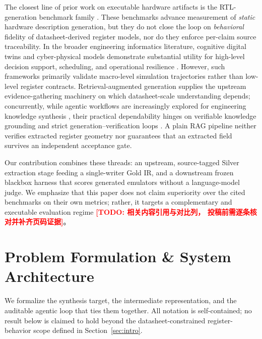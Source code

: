 \documentclass[preprint,review]{elsarticle}
\theoremstyle{definition}
\newcommand{\todo}[1]{\textcolor{red}{\textbf{[TODO: #1]}}}
\begin{document}
The closest line of prior work on executable hardware artifacts is the RTL-generation
benchmark family \cite{thakur2023verilogeval,lu2024rtllm,liu2023chipnemo}. These benchmarks
advance measurement of {\em static} hardware description generation, but they do not close
the loop on {\em behavioral} fidelity of datasheet-derived register models, nor do they
enforce per-claim source traceability. In the broader engineering informatics literature,
cognitive digital twins and cyber-physical models demonstrate substantial utility for
high-level decision support, scheduling, and operational resilience \cite{gao2024digital,lim2024graph,lim2024incorporating}.
However, such frameworks primarily validate macro-level simulation trajectories rather than
low-level register contracts. Retrieval-augmented generation \cite{lewis2020retrieval}
supplies the upstream evidence-gathering machinery on which datasheet-scale understanding
depends; concurrently, while agentic workflows are increasingly explored for engineering
knowledge synthesis \cite{zhou2025examining,trappey2025inventive}, their practical dependability
hinges on verifiable knowledge grounding and strict generation--verification loops \cite{kuo2026technology,liu2024multi}.
A plain RAG pipeline neither verifies extracted register geometry nor guarantees that an
extracted field survives an independent acceptance gate.

Our contribution combines these threads: an upstream, source-tagged Silver extraction
stage feeding a single-writer Gold IR, and a downstream frozen blackbox harness that
scores generated emulators without a language-model judge. We emphasize that this paper
does not claim superiority over the cited benchmarks on their own metrics; rather, it
targets a complementary and executable evaluation regime \todo{相关内容引用与对比列，
投稿前需逐条核对并补齐页码证据}。

\section{Problem Formulation \& System Architecture}
\label{sec:problem}

We formalize the synthesis target, the intermediate representation, and the auditable
agentic loop that ties them together. All notation is self-contained; no result below is
claimed to hold beyond the datasheet-constrained register-behavior scope defined in
Section~\ref{sec:intro}.
\end{document}
